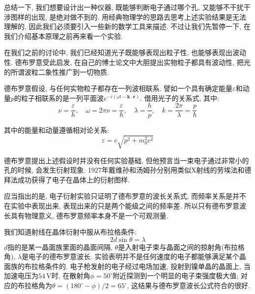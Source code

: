 总结一下, 我们想要设计出一种仪器, 既能够判断电子通过哪个孔, 又能够不干扰干涉图样的出现, 是绝对做不到的. 用经典物理学的思路去思考上述实验结果是无法理解的, 因此我们必须要引入一些新的数学工具来描述. 不过让我们先暂停一下, 在我们介绍基本原理之前再来看一个实验.

在我们之前的讨论中, 我们已经知道光子既能够表现出粒子性, 也能够表现出波动性. 德布罗意受此启发, 在自己的博士论文中大胆提出实物粒子都具有波动性, 把光的所谓波粒二象性推广到一切物质.

德布罗意假设, 与任何实物粒子都存在一列波相联系. 譬如一个具有确定能量$\varepsilon$和动量$p$的粒子相联系的是一列平面波$e^{-i(\omega t -\mathbf{k}\cdot \bm{r})}$. 借用光子的关系式, 其中:
\[
\nu = \frac{\varepsilon}{h}, \quad \omega = 2\pi\nu = \frac{\varepsilon}{\hbar}, \quad \lambda = \frac{h}{p}, \quad k = \frac{2\pi}{\lambda} = \frac{p}{\hbar}
\]

其中的能量和动量遵循相对论关系:
\[
\varepsilon = c\sqrt{p^2+m_0^2c^2}
\]

德布罗意提出上述假设时并没有任何实验基础, 但他预言当一束电子通过非常小的孔的时候, 会发生衍射现象. 1927年戴维孙和汤姆孙分别用类似X射线的劳埃法和德拜法成功获得了电子在晶体上的衍射图样.

应当指出的是, 电子衍射实验只证明了德布罗意的波长关系式, 而频率关系是并不在实验中表现出来, 表现出来的只是两个能级之间的频率差. 所以只有德布罗意波长具有物理意义, 德布罗意频率本身不是一个可观测量.

我们知道射线在晶体衍射中服从布拉格条件:
\[
2d\sin\theta = \lambda
\]
$d$指的是某一晶面族里面的晶面间隔, $\theta$是入射电子束与晶面之间的掠射角(布拉格角), $\lambda$是电子的德布罗意波长. 实验表明并不是任何速度的电子都能够满足某个晶面族的布拉格条件的. 电子枪发射的电子经过电场加速, 投射到镍单晶的晶面上, 当加速电压为$54\,\mathrm{V}$时, 在散射角$\phi=50^{\circ}$附近探测到一个明显的电子束强度极大值; 对应的布拉格角为$\theta=(180^{\circ}-\phi)/2=65^{\circ}$, 这结果与德布罗意波长公式符合的很好.
